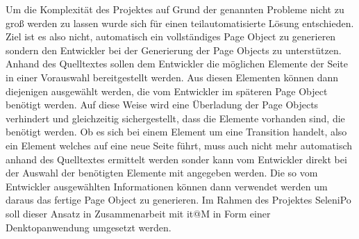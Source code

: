 Um die Komplexität des Projektes auf Grund der genannten Probleme nicht zu groß werden zu lassen wurde sich für einen teilautomatisierte Lösung entschieden.
Ziel ist es also nicht, automatisch ein vollständiges Page Object zu generieren sondern den Entwickler bei der Generierung der Page Objects zu unterstützen. Anhand des Quelltextes sollen dem Entwickler die möglichen Elemente der Seite in einer Vorauswahl bereitgestellt werden. Aus diesen Elementen können dann diejenigen ausgewählt werden, die vom Entwickler im späteren Page Object benötigt werden. Auf diese Weise wird eine Überladung der Page Objects verhindert und gleichzeitig sichergestellt, dass die Elemente vorhanden sind, die benötigt werden.
Ob es sich bei einem Element um eine Transition handelt, also ein Element welches auf eine neue Seite führt, muss auch nicht mehr automatisch anhand des Quelltextes ermittelt werden sonder kann vom Entwickler direkt bei der Auswahl der benötigten Elemente mit angegeben werden.
Die so vom Entwickler ausgewählten Informationen können dann verwendet werden um daraus das fertige Page Object zu generieren.
Im Rahmen des Projektes SeleniPo soll dieser Ansatz in Zusammenarbeit mit it@M in Form einer Denktopanwendung umgesetzt werden. 

